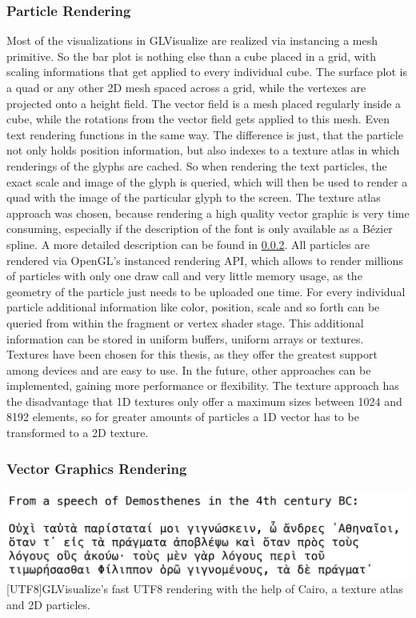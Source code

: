 \subsubsection{Particle Rendering}
Most of the visualizations in GLVisualize are realized via instancing a mesh primitive.
So the bar plot is nothing else than a cube placed in a grid, with scaling informations that get applied to every individual cube. The surface plot is a quad or any other 2D mesh spaced across a grid, while the vertexes are projected onto a height field. The vector field is a mesh placed regularly inside a cube, while the rotations from the vector field gets applied to this mesh. 
Even text rendering functions in the same way. The difference is just, that the particle not only holds position information, but also indexes to a texture atlas in which renderings of the glyphs are cached. So when rendering the text particles, the exact scale and image of the glyph is queried, which will then be used to render a quad with the image of the particular glyph to the screen.
The texture atlas approach was chosen, because rendering a high quality vector graphic is very time consuming, especially if the description of the font is only available as a Bézier spline. A more detailed description can be found in \ref{vector rendering}.
All particles are rendered via OpenGL's instanced rendering API, which allows to render millions of particles with only one draw call and very little memory usage, as the geometry of the particle just needs to be uploaded one time.
For every individual particle additional information like color, position, scale and so forth can be queried from within the fragment or vertex shader stage.
This additional information can be stored in uniform buffers, uniform arrays or textures. Textures have been chosen for this thesis, as they offer the greatest support among devices and are easy to use. In the future, other approaches can be implemented, gaining more performance or flexibility.
The texture approach has the disadvantage that 1D textures only offer a maximum sizes between 1024 and 8192 elements, so for greater amounts of particles a 1D vector has to be transformed to a 2D texture.


\subsubsection{Vector Graphics Rendering}\label{vector rendering}
\vspace{1em}
\begin{minipage}{\linewidth}
    \centering
    \includegraphics[width=0.9\linewidth]{graphics/utf8.png}
    [UTF8]{GLVisualize's fast UTF8 rendering with the help of Cairo, a texture atlas and 2D particles.}
    \label{fig:UTF8}
\end{minipage}

